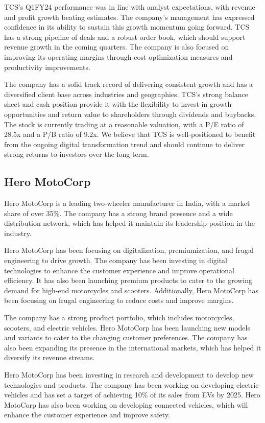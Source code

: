 TCS's Q1FY24 performance was in line with analyst expectations, with revenue and profit growth beating estimates. The company's management has expressed confidence in its ability to sustain this growth momentum going forward. TCS has a strong pipeline of deals and a robust order book, which should support revenue growth in the coming quarters. The company is also focused on improving its operating margins through cost optimization measures and productivity improvements.

The company has a solid track record of delivering consistent growth and has a diversified client base across industries and geographies. TCS's strong balance sheet and cash position provide it with the flexibility to invest in growth opportunities and return value to shareholders through dividends and buybacks. The stock is currently trading at a reasonable valuation, with a P/E ratio of 28.5x and a P/B ratio of 9.2x. We believe that TCS is well-positioned to benefit from the ongoing digital transformation trend and should continue to deliver strong returns to investors over the long term.

    \subsection{Hero MotoCorp} Hero MotoCorp is a leading two-wheeler manufacturer in India, with a market share of over 35\%. The company has a strong brand presence and a wide distribution network, which has helped it maintain its leadership position in the industry.

Hero MotoCorp has been focusing on digitalization, premiumization, and frugal engineering to drive growth. The company has been investing in digital technologies to enhance the customer experience and improve operational efficiency. It has also been launching premium products to cater to the growing demand for high-end motorcycles and scooters. Additionally, Hero MotoCorp has been focusing on frugal engineering to reduce costs and improve margins.

The company has a strong product portfolio, which includes motorcycles, scooters, and electric vehicles. Hero MotoCorp has been launching new models and variants to cater to the changing customer preferences. The company has also been expanding its presence in the international markets, which has helped it diversify its revenue streams.

Hero MotoCorp has been investing in research and development to develop new technologies and products. The company has been working on developing electric vehicles and has set a target of achieving 10\% of its sales from EVs by 2025. Hero MotoCorp has also been working on developing connected vehicles, which will enhance the customer experience and improve safety.

